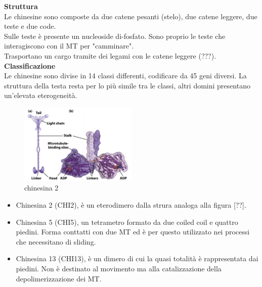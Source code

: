             \textbf{Struttura} \\
                Le chinesine sono composte da due catene pesanti (stelo), due catene leggere, due teste e due code. \\
                Sulle teste è presente un nucleoside di-fosfato. Sono proprio le teste che interagiscono con il MT per "camminare".\\
                Trasportano un cargo tramite dei legami con le catene leggere (???).\\
            
            \textbf{Classificazione}\\
                Le chinesine sono divise in 14 classi differenti, codificare da 45 geni diversi. La struttura della testa resta per lo più simile tra le classi, altri domini presentano un'elevata eterogeneità.
                \begin{figure}[h]
                    \centering
                    \includegraphics[width=0.5\textwidth]{images/chinesina.JPG}
                    \caption{\small chinesina 2}
                    \label{fig:mesh1}
                \end{figure}
                \begin{itemize}
                    \item Chinesina 2 (CHI2), è un eterodimero dalla strura analoga alla figura [??].
                    \item Chinesina 5 (CHI5), un tetrametro formato da due coiled coil e quattro piedini. Forma conttatti con due MT ed è per questo utilizzato nei processi che necessitano di sliding.
                    \item Chinesina 13 (CHI13), è un dimero di cui la quasi totalità è rappresentata dai piedini. Non è destinato al movimento ma alla catalizzazione della depolimerizzazione dei MT.
                \end{itemize}
                
